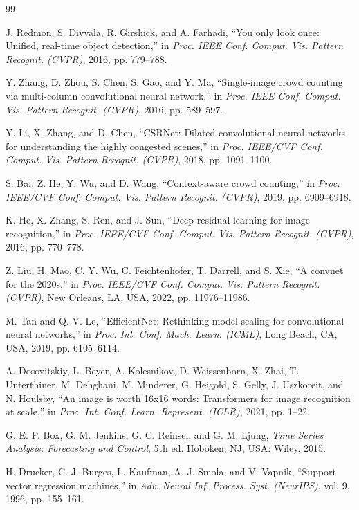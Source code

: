 \documentclass[journal,twocolumn]{IEEEtran}
\begin{document}
\begin{thebibliography}{99}

J. Redmon, S. Divvala, R. Girshick, and A. Farhadi, ``You only look once: Unified, real-time object detection,'' in \emph{Proc. IEEE Conf. Comput. Vis. Pattern Recognit. (CVPR)}, 2016, pp. 779--788.

Y. Zhang, D. Zhou, S. Chen, S. Gao, and Y. Ma, ``Single-image crowd counting via multi-column convolutional neural network,'' in \emph{Proc. IEEE Conf. Comput. Vis. Pattern Recognit. (CVPR)}, 2016, pp. 589--597.

Y. Li, X. Zhang, and D. Chen, ``CSRNet: Dilated convolutional neural networks for understanding the highly congested scenes,'' in \emph{Proc. IEEE/CVF Conf. Comput. Vis. Pattern Recognit. (CVPR)}, 2018, pp. 1091--1100.

S. Bai, Z. He, Y. Wu, and D. Wang, ``Context-aware crowd counting,'' in \emph{Proc. IEEE/CVF Conf. Comput. Vis. Pattern Recognit. (CVPR)}, 2019, pp. 6909--6918.

K. He, X. Zhang, S. Ren, and J. Sun, ``Deep residual learning for image recognition,'' in \emph{Proc. IEEE/CVF Conf. Comput. Vis. Pattern Recognit. (CVPR)}, 2016, pp. 770--778.

Z. Liu, H. Mao, C. Y. Wu, C. Feichtenhofer, T. Darrell, and S. Xie, ``A convnet for the 2020s,'' in \emph{Proc. IEEE/CVF Conf. Comput. Vis. Pattern Recognit. (CVPR)}, New Orleans, LA, USA, 2022, pp. 11976--11986.

M. Tan and Q. V. Le, ``EfficientNet: Rethinking model scaling for convolutional neural networks,'' in \emph{Proc. Int. Conf. Mach. Learn. (ICML)}, Long Beach, CA, USA, 2019, pp. 6105--6114.

A. Dosovitskiy, L. Beyer, A. Kolesnikov, D. Weissenborn, X. Zhai, T. Unterthiner, M. Dehghani, M. Minderer, G. Heigold, S. Gelly, J. Uszkoreit, and N. Houlsby, ``An image is worth 16x16 words: Transformers for image recognition at scale,'' in \emph{Proc. Int. Conf. Learn. Represent. (ICLR)}, 2021, pp. 1--22.

G. E. P. Box, G. M. Jenkins, G. C. Reinsel, and G. M. Ljung, \emph{Time Series Analysis: Forecasting and Control}, 5th ed. Hoboken, NJ, USA: Wiley, 2015.

H. Drucker, C. J. Burges, L. Kaufman, A. J. Smola, and V. Vapnik, ``Support vector regression machines,'' in \emph{Adv. Neural Inf. Process. Syst. (NeurIPS)}, vol. 9, 1996, pp. 155--161.


\end{thebibliography}
\end{document}
